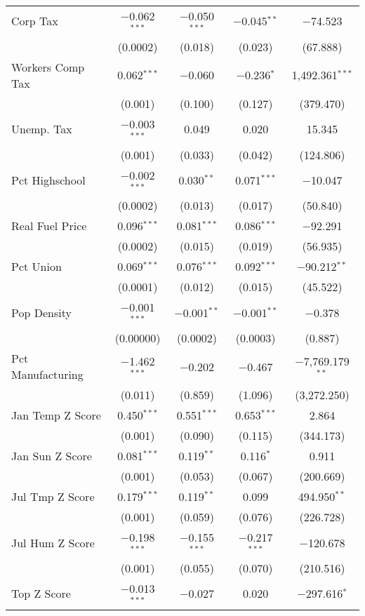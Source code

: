 \begin{table}[!htbp]
\begin{tabular}{@{\extracolsep{5pt}}lcccc}
  Corp Tax & $-$0.062$^{***}$ & $-$0.050$^{***}$ & $-$0.045$^{**}$ & $-$74.523 \\ 
  & (0.0002) & (0.018) & (0.023) & (67.888) \\ 
  Workers Comp Tax & 0.062$^{***}$ & $-$0.060 & $-$0.236$^{*}$ & 1,492.361$^{***}$ \\ 
  & (0.001) & (0.100) & (0.127) & (379.470) \\ 
  Unemp. Tax & $-$0.003$^{***}$ & 0.049 & 0.020 & 15.345 \\ 
  & (0.001) & (0.033) & (0.042) & (124.806) \\ 
  Pct Highschool & $-$0.002$^{***}$ & 0.030$^{**}$ & 0.071$^{***}$ & $-$10.047 \\ 
  & (0.0002) & (0.013) & (0.017) & (50.840) \\ 
  Real Fuel Price & 0.096$^{***}$ & 0.081$^{***}$ & 0.086$^{***}$ & $-$92.291 \\ 
  & (0.0002) & (0.015) & (0.019) & (56.935) \\ 
  Pct Union & 0.069$^{***}$ & 0.076$^{***}$ & 0.092$^{***}$ & $-$90.212$^{**}$ \\ 
  & (0.0001) & (0.012) & (0.015) & (45.522) \\ 
  Pop Density & $-$0.001$^{***}$ & $-$0.001$^{**}$ & $-$0.001$^{**}$ & $-$0.378 \\ 
  & (0.00000) & (0.0002) & (0.0003) & (0.887) \\ 
  Pct Manufacturing & $-$1.462$^{***}$ & $-$0.202 & $-$0.467 & $-$7,769.179$^{**}$ \\ 
  & (0.011) & (0.859) & (1.096) & (3,272.250) \\ 
  Jan Temp Z Score & 0.450$^{***}$ & 0.551$^{***}$ & 0.653$^{***}$ & 2.864 \\ 
  & (0.001) & (0.090) & (0.115) & (344.173) \\ 
  Jan Sun Z Score & 0.081$^{***}$ & 0.119$^{**}$ & 0.116$^{*}$ & 0.911 \\ 
  & (0.001) & (0.053) & (0.067) & (200.669) \\ 
  Jul Tmp Z Score & 0.179$^{***}$ & 0.119$^{**}$ & 0.099 & 494.950$^{**}$ \\ 
  & (0.001) & (0.059) & (0.076) & (226.728) \\ 
  Jul Hum Z Score & $-$0.198$^{***}$ & $-$0.155$^{***}$ & $-$0.217$^{***}$ & $-$120.678 \\ 
  & (0.001) & (0.055) & (0.070) & (210.516) \\ 
  Top Z Score & $-$0.013$^{***}$ & $-$0.027 & 0.020 & $-$297.616$^{*}$ \\ 

\end{tabular}
\end{table}
